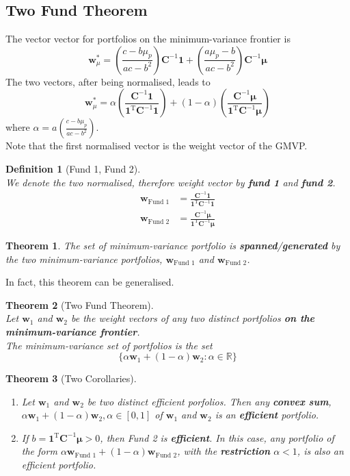 \documentclass[12pt]{article}
\newtheorem{definition}{Definition}[section]
\newtheorem{theorem}{Theorem}[section]
\theoremstyle{definition}
\begin{document}
\subsection{Two Fund Theorem}
The vector vector for portfolios on the minimum-variance frontier is
\[
\mathbf{w}_\mu^\ast=\left(\frac{c-b\mu_p}{ac-b^2}\right)\mathbf{C}^{-1}\mathbf{1}+\left(\frac{a\mu_p-b}{ac-b^2}\right)\mathbf{C}^{-1}\bm{\mu}
\]
The two vectors, after being normalised, leads to
\[
\mathbf{w}_\mu^\ast = \alpha\left(\frac{\mathbf{C}^{-1}\mathbf{1}}{\mathbf{1}^\text{T}\mathbf{C}^{-1}\mathbf{1}}\right)+(1-\alpha)\left(\frac{\mathbf{C}^{-1}\bm{\mu}}{\mathbf{1}^\text{T}\mathbf{C}^{-1}\bm{\mu}}\right)
\]
where $\alpha=a\left(\frac{c-b\mu_p}{ac-b^2}\right)$.\\
Note that the first normalised vector is the weight vector of the GMVP.
\begin{definition}[Fund 1, Fund 2]
\hfill\\\normalfont We denote the two normalised, therefore weight vector by \textbf{fund 1} and \textbf{fund 2}.
\begin{align*}
\mathbf{w}_\text{Fund 1}&=\frac{\mathbf{C}^{-1}\mathbf{1}}{\mathbf{1}^\text{T}\mathbf{C}^{-1}\mathbf{1}}\\
\mathbf{w}_\text{Fund 2}&=\frac{\mathbf{C}^{-1}\bm{\mu}}{\mathbf{1}^\text{T}\mathbf{C}^{-1}\bm{\mu}}
\end{align*}
\end{definition}
\begin{theorem}\normalfont The set of minimum-variance portfolio is \textbf{spanned}/\textbf{generated} by the two minimum-variance portfolios, $\mathbf{w}_\text{Fund 1}$ and $\mathbf{w}_\text{Fund 2}$.\end{theorem}
In fact, this theorem can be generalised.
\begin{theorem}[Two Fund Theorem]\hfill\\\normalfont Let $\mathbf{w}_1$ and $\mathbf{w}_2$ be the weight vectors of any two \textit{distinct} portfolios \textbf{on the minimum-variance frontier}. \\The minimum-variance set of portfolios is the set
\[
\{\alpha\mathbf{w}_1+(1-\alpha)\mathbf{w}_2:\alpha\in\mathbb{R}\}
\]
\end{theorem}
\begin{theorem}[Two Corollaries]\hfill\\\normalfont
\begin{enumerate}
  \item Let $\mathbf{w}_1$ and $\mathbf{w}_2$ be two distinct efficient porfolios. Then any \textbf{convex sum}, $\alpha\mathbf{w}_1+(1-\alpha)\mathbf{w}_2, \alpha\in[0,1]$ of $\mathbf{w}_1$ and $\mathbf{w}_2$ is an \textbf{efficient} portfolio.
  \item If $b=\mathbf{1}^\text{T}\mathbf{C}^{-1}\bm{\mu}>0$, then Fund 2 is \textbf{efficient}. In this case, any portfolio of the form $\alpha\mathbf{w}_\text{Fund 1}+(1-\alpha)\mathbf{w}_\text{Fund 2}$, with the \textbf{restriction} $\alpha<1$, is also an efficient portfolio. 
\end{enumerate}
\end{theorem}
\end{document}
